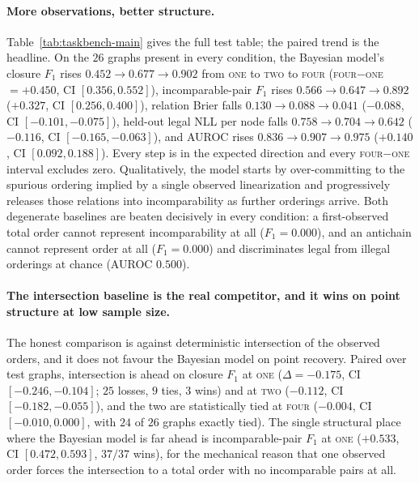 \paragraph{More observations, better structure.}
Table~\ref{tab:taskbench-main} gives the full test table; the paired trend is
the headline. On the $26$ graphs present in every condition, the Bayesian
model's closure $F_1$ rises $0.452 \to 0.677 \to 0.902$ from \textsc{one} to
\textsc{two} to \textsc{four} (\textsc{four}$-$\textsc{one}
$= +0.450$, CI $[0.356, 0.552]$), incomparable-pair $F_1$ rises
$0.566 \to 0.647 \to 0.892$ ($+0.327$, CI $[0.256, 0.400]$), relation Brier
falls $0.130 \to 0.088 \to 0.041$ ($-0.088$, CI $[-0.101, -0.075]$), held-out
legal NLL per node falls $0.758 \to 0.704 \to 0.642$ ($-0.116$, CI
$[-0.165, -0.063]$), and AUROC rises $0.836 \to 0.907 \to 0.975$ ($+0.140$,
CI $[0.092, 0.188]$). Every step is in the expected direction and every
\textsc{four}$-$\textsc{one} interval excludes zero. Qualitatively, the model
starts by over-committing to the spurious ordering implied by a single observed
linearization and progressively releases those relations into incomparability as
further orderings arrive. Both degenerate baselines are beaten decisively in
every condition: a first-observed total order cannot represent incomparability
at all ($F_1 = 0.000$), and an antichain cannot represent order at all
($F_1 = 0.000$) and discriminates legal from illegal orderings at chance
(AUROC $0.500$).

\paragraph{The intersection baseline is the real competitor, and it wins on
point structure at low sample size.}
The honest comparison is against deterministic intersection of the observed
orders, and it does not favour the Bayesian model on point recovery. Paired over
test graphs, intersection is ahead on closure $F_1$ at \textsc{one}
($\Delta = -0.175$, CI $[-0.246, -0.104]$; $25$ losses, $9$ ties, $3$ wins) and
at \textsc{two} ($-0.112$, CI $[-0.182, -0.055]$), and the two are statistically
tied at \textsc{four} ($-0.004$, CI $[-0.010, 0.000]$, with $24$ of $26$ graphs
exactly tied). The single structural place where the Bayesian model is far ahead
is incomparable-pair $F_1$ at \textsc{one} ($+0.533$, CI $[0.472, 0.593]$,
$37/37$ wins), for the mechanical reason that one observed order forces the
intersection to a total order with no incomparable pairs at all.

